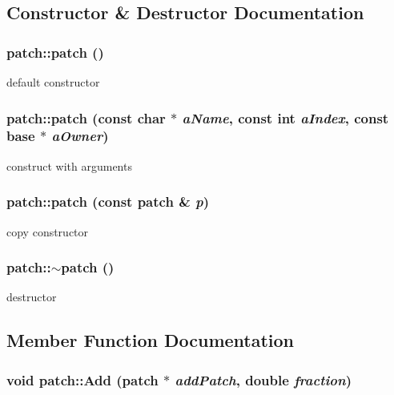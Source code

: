 \subsection{Constructor \& Destructor Documentation}
\hypertarget{classpatch_ac4c885fe59fc247c9e6f4871ac8966a4}{
\subsubsection[{patch}]{\setlength{\rightskip}{0pt plus 5cm}patch::patch ()}}
\label{classpatch_ac4c885fe59fc247c9e6f4871ac8966a4}


default constructor \hypertarget{classpatch_a962e1a1e7f87bd16d323c472e5dafbf0}{
\subsubsection[{patch}]{\setlength{\rightskip}{0pt plus 5cm}patch::patch (const char $\ast$ {\em aName}, \/  const int {\em aIndex}, \/  const {\bf base} $\ast$ {\em aOwner})}}
\label{classpatch_a962e1a1e7f87bd16d323c472e5dafbf0}


construct with arguments \hypertarget{classpatch_adb9e4cd6ab9f2df28a8c57e330b55719}{
\subsubsection[{patch}]{\setlength{\rightskip}{0pt plus 5cm}patch::patch (const {\bf patch} \& {\em p})}}
\label{classpatch_adb9e4cd6ab9f2df28a8c57e330b55719}


copy constructor \hypertarget{classpatch_a673a341f34953f79c30d82b27a55ba7a}{
\subsubsection[{$\sim$patch}]{\setlength{\rightskip}{0pt plus 5cm}patch::$\sim$patch ()}}
\label{classpatch_a673a341f34953f79c30d82b27a55ba7a}


destructor 

\subsection{Member Function Documentation}
\hypertarget{classpatch_ace800e40d39f187d3d37b7d87b972a62}{
\subsubsection[{Add}]{\setlength{\rightskip}{0pt plus 5cm}void patch::Add ({\bf patch} $\ast$ {\em addPatch}, \/  double {\em fraction})}}
\label{classpatch_ace800e40d39f187d3d37b7d87b972a62}



